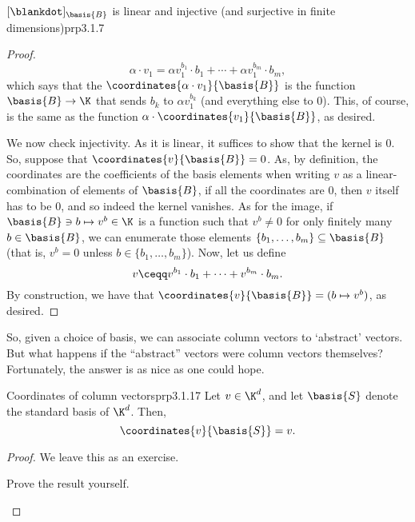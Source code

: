 \begin{prp}{$[\blankdot ]_{\basis{B}}$ is linear and injective (and surjective in finite dimensions)}{prp3.1.7}
\begin{proof}
	\begin{equation}
		\alpha \cdot v_1=\alpha v_1^{b_1}\cdot b_1+\cdots +\alpha v_1^{b_m}\cdot b_m,
	\end{equation}
	which says that the $\coordinates{\alpha \cdot v_1}{\basis{B}}$ is the function $\basis{B}\rightarrow \K$ that sends $b_k$ to $\alpha v_1^{b_k}$ (and everything else to $0$).  This, of course, is the same as the function $\alpha \cdot \coordinates{v_1}{\basis{B}}$, as desired.
	
	We now check injectivity.  As it is linear, it suffices to show that the kernel is $0$.  So, suppose that $\coordinates{v}{\basis{B}}=0$.  As, by definition, the coordinates are the coefficients of the basis elements when writing $v$ as a linear-combination of elements of $\basis{B}$, if all the coordinates are $0$, then $v$ itself has to be $0$, and so indeed the kernel vanishes.  As for the image, if $\basis{B}\ni b\mapsto v^b\in \K$ is a function such that $v^b\neq 0$ for only finitely many $b\in \basis{B}$, we can enumerate those elements $\{ b_1,\ldots ,b_m\} \subseteq \basis{B}$ (that is, $v^b=0$ unless $b\in \{ b_1,\ldots ,b_m\}$).  Now, let us define
	\begin{equation}
		v\ceqq v^{b_1}\cdot b_1+\cdots +v^{b_m}\cdot b_m.
	\end{equation}
	By construction, we have that $\coordinates{v}{\basis{B}}=(b\mapsto v^b)$, as desired.
\end{proof}
\end{prp}
So, given a choice of basis, we can associate column vectors to `abstract' vectors.  But what happens if the ``abstract'' vectors were column vectors themselves?  Fortunately, the answer is as nice as one could hope.
\begin{prp}{Coordinates of column vectors}{prp3.1.17}
	Let $v\in \K ^d$, and let $\basis{S}$ denote the standard basis of $\K ^d$.  Then,
	\begin{equation}
		\coordinates{v}{\basis{S}}=v.
	\end{equation}
	\begin{proof}
		We leave this as an exercise.
		\begin{exr}[breakable=false]{}{}
			Prove the result yourself.
		\end{exr}
	\end{proof}
\end{prp}
